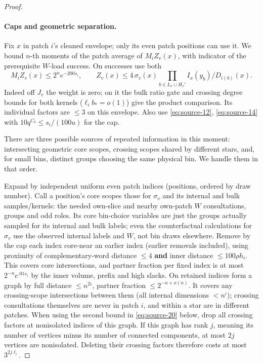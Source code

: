 \begin{proof}\leavevmode\par
\paragraph{Caps and geometric separation.}
Fix \(x\) in patch \(i\)'s cleaned envelope; only its even patch positions can use it. We bound \(n\)-th moments of the patch average of \(M_i Z_v(x)\), with indicator of the prerequisite \(W\)-load success. On successes use both
\begin{equation}
 M_i Z_v(x)\le 2^n e^{-200s_i},\qquad
 Z_v(x)\le 4\,\sigma_v(x)\prod_{b\in L_v\cup H_v'} I_x(y_b)/D_{i(b)}(x).     \label{eq:source-20}
\end{equation}
Indeed off \(J_v\) the weight is zero; on it the bulk ratio gate and crossing degree bounds for both kernels (\(\ell_i b_*=o(1)\)) give the product comparison. Its individual factors are \(\le3\) on this envelope. Also use \eqref{eq:source-12}, \eqref{eq:source-14} with \(10q^{C_b}\le s_i/(100u)\) for the cap.

There are three possible sources of repeated information in this moment: intersecting geometric core scopes, crossing scopes shared by different stars, and, for small bins, distinct groups choosing the same physical bin. We handle them in that order.

Expand by independent uniform even patch indices (positions, ordered by draw number). Call a position's core scopes those for \(\sigma_v\) and its internal and bulk samples/kernels: the needed own-slice and nearby own-patch \(W\) consultations, groups and odd roles. Its core bin-choice variables are just the groups actually sampled for its internal and bulk labels; even the counterfactual calculations for \(\sigma_v\) use the observed internal labels and \(W\), not bin draws elsewhere. Remove by the cap each index core-near an earlier index (earlier removals included), using proximity of complementary-word distance \(\le4\) \textbf{and} inner distance \(\le100\rho h_i\). This covers core intersections, and partner fraction per fixed index is at most \(2^{-n}e^{.01s_i}\) by the inner volume, prefix and high slacks. On retained indices form a graph by full distance \(\le n^{2\iota}\), partner fraction \(\le2^{-n+o(n)}\). It covers any crossing-scope intersections between them (all internal dimensions \(<n^\iota\)); crossing consultations themselves are never in patch \(i\), and within a star are in different patches. When using the second bound in \eqref{eq:source-20} below, drop all crossing factors at nonisolated indices of this graph. If this graph has rank \(j\), meaning its number of vertices minus its number of connected components, at most \(2j\) vertices are nonisolated. Deleting their crossing factors therefore costs at most \(3^{2j\ell_i}\).


\end{proof}
